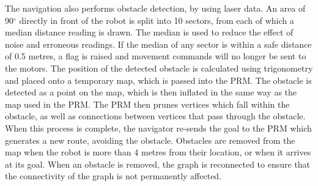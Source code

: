 \documentclass[conference]{IEEEtran}
\begin{document}
The navigation also performs obstacle detection, by using laser data. An area of 90$^\circ$ directly in front of the robot is split into 10 sectors, from each of which a median distance reading is drawn. The median is used to reduce the effect of noise and erroneous readings. If the median of any sector is within a safe distance of 0.5 metres, a flag is raised and movement commands will no longer be sent to the motors. The position of the detected obstacle is calculated using trigonometry and placed onto a temporary map, which is passed into the PRM. The obstacle is detected as a point on the map, which is then inflated in the same way as the map used in the PRM. The PRM then prunes vertices which fall within the obstacle, as well as connections between vertices that pass through the obstacle. When this process is complete, the navigator re-sends the goal to the PRM which generates a new route, avoiding the obstacle. Obstacles are removed from the map when the robot is more than 4 metres from their location, or when it arrives at its goal. When an obstacle is removed, the graph is reconnected to ensure that the connectivity of the graph is not permanently affected.
\end{document}
